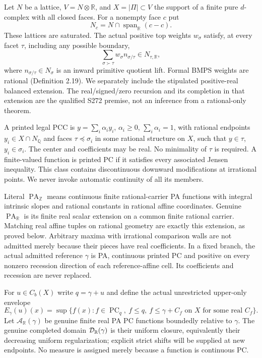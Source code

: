\documentclass[11pt]{article}
\newcommand{\R}{\mathbb R}\newcommand{\Q}{\mathbb Q}\newcommand{\Z}{\mathbb Z}
\newcommand{\PC}{\operatorname{PC}_q}\newcommand{\PA}{\operatorname{PA}}
\begin{document}
Let $N$ be a lattice, $V=N\otimes\R$, and $X=|\Pi|\subset V$ the support of a finite pure $d$-complex with all closed faces. For a nonempty face $c$ put
\[
 N_c=N\cap\operatorname{span}_\R(c-c).
\]
These lattices are saturated. The actual positive top weights $w_\sigma$ satisfy, at every facet $\tau$, including any possible boundary,
\[
 \sum_{\sigma\succ\tau}w_\sigma n_{\sigma/\tau}\in N_{\tau,\R},             \tag{1.1}
\]
where $n_{\sigma/\tau}\in N_\sigma$ is an inward primitive quotient lift. Formal BMPS weights are rational (Definition 2.19). We separately include the stipulated positive-real balanced extension. The real/signed/zero recursion and its completion in that extension are the qualified S272 premise, not an inference from a rational-only theorem.

A printed legal PCC is $y=\sum_i\alpha_i y_i$, $\alpha_i\geq0$, $\sum_i\alpha_i=1$, with rational endpoints $y_i\in X\cap N_\Q$ and faces $\tau\preceq\sigma_i$ in some rational structure on $X$, such that $y\in\tau$, $y_i\in\sigma_i$. The center and coefficients may be real. No minimality of $\tau$ is required. A finite-valued function is printed PC if it satisfies every associated Jensen inequality. This class contains discontinuous downward modifications at irrational points. We never invoke automatic continuity of all its members.

Literal $\PA_\Z$ means continuous finite rational-carrier PA functions with integral intrinsic slopes and rational constants in rational affine coordinates. Genuine $\PA_\R$ is its finite real scalar extension on a common finite rational carrier. Matching real affine tuples on rational geometry are exactly this extension, as proved below. Arbitrary maxima with irrational comparison walls are not admitted merely because their pieces have real coefficients. In a fixed branch, the actual admitted reference $\gamma$ is PA, continuous printed PC and positive on every nonzero recession direction of each reference-affine cell. Its coefficients and recession are never replaced.

For $u\in C_b(X)$ write $q=\gamma+u$ and define the actual unrestricted upper-only envelope
\[
 E_\gamma(u)(x)=\sup\{f(x): f\in\PC,\ f\leq q,\ f\leq\gamma+C_f
                  \text{ on }X\text{ for some real }C_f\}.             \tag{1.2}
\]
Let $\mathcal A_\R(\gamma)$ be genuine finite real PA PC functions boundedly relative to $\gamma$. The genuine completed domain $\D$ is their uniform closure, equivalently their decreasing uniform regularization; explicit strict shifts will be supplied at new endpoints. No measure is assigned merely because a function is continuous PC.
\end{document}
